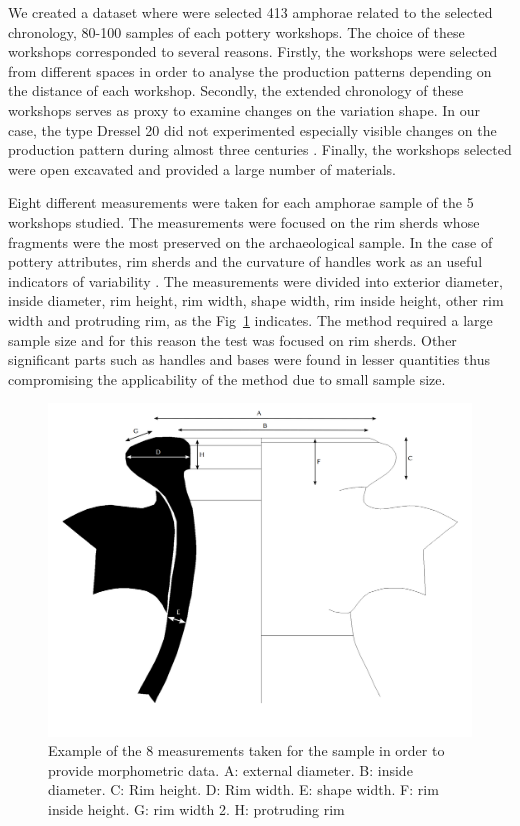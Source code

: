 \documentclass[review]{elsarticle}
\begin{document}
We created a dataset where were selected 413 amphorae related to the selected chronology, 80-100 samples of each pottery workshops. The choice of these workshops corresponded to several reasons. Firstly, the workshops were selected from different spaces in order to analyse the production patterns depending on the distance of each workshop. Secondly, the extended chronology of these workshops serves as proxy to examine changes on the variation shape. In our case, the type Dressel 20 did not experimented especially visible changes on the production pattern during almost three centuries \citep{berni_dressel_2016}. Finally, the workshops selected were open excavated and provided a large number of materials.   

Eight different measurements were taken for each amphorae sample of the 5 workshops studied. The measurements were focused on the rim sherds whose fragments were the most preserved on the archaeological sample. In the case of pottery attributes, rim sherds and the curvature of handles work as an useful indicators of variability \citep{berni_millet_epigrafianforica_2008}.
The measurements were divided into exterior diameter, inside diameter, rim height, rim width, shape width, rim inside height, other rim width and protruding rim, as the Fig~\ref{mesures} indicates. The method required a large sample size and for this reason the test was focused on rim sherds. Other significant parts such as handles and bases were found in lesser quantities thus compromising the applicability of the method due to small sample size.

\begin{figure}[htp]
	\centering
\includegraphics[scale=0.10]{mesures.png}
\caption{Example of the 8 measurements taken for the sample in order to provide morphometric data. A: external diameter. B: inside diameter. C: Rim height. D: Rim width. E: shape width. F: rim inside height. G: rim width 2. H: protruding rim}
\label{mesures}
\end{figure} 
\end{document}
